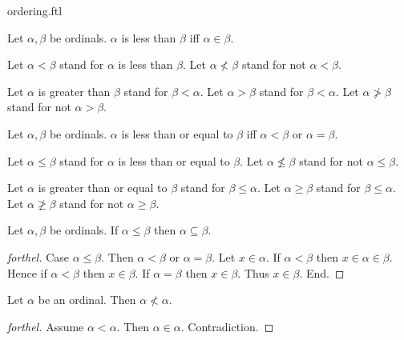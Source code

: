 \documentclass{naproche-library}
\begin{document}
\begin{smodule}[title=The Standard Ordering of the Ordinals]{ordering.ftl}

\begin{definition}[forthel,id=SET_THEORY_02_6654252130762752]
  Let $\alpha, \beta$ be ordinals.
  $\alpha$ is less than $\beta$ iff $\alpha \in \beta$.

  Let $\alpha < \beta$ stand for $\alpha$ is less than $\beta$.
  Let $\alpha \nless \beta$ stand for not $\alpha < \beta$.

  Let $\alpha$ is greater than $\beta$ stand for $\beta < \alpha$.
  Let $\alpha > \beta$ stand for $\beta < \alpha$.
  Let $\alpha \ngtr \beta$ stand for not $\alpha > \beta$.
\end{definition}

\begin{definition}[forthel,id=SET_THEORY_02_2639956210089984]
  Let $\alpha, \beta$ be ordinals.
  $\alpha$ is less than or equal to $\beta$ iff $\alpha < \beta$ or $\alpha = \beta$.

  Let $\alpha \leq \beta$ stand for $\alpha$ is less than or equal to $\beta$.
  Let $\alpha \nleq \beta$ stand for not $\alpha \leq \beta$.

  Let $\alpha$ is greater than or equal to $\beta$ stand for $\beta \leq \alpha$.
  Let $\alpha \geq \beta$ stand for $\beta \leq \alpha$.
  Let $\alpha \ngeq \beta$ stand for not $\alpha \geq \beta$.
\end{definition}

\begin{proposition}[forthel,id=SET_THEORY_02_3089369577553920]
  Let $\alpha, \beta$ be ordinals.
  If $\alpha \leq \beta$ then $\alpha \subseteq \beta$.
\end{proposition}
\begin{proof}[forthel]
  Case $\alpha \leq \beta$.
    Then $\alpha < \beta$ or $\alpha = \beta$.
    Let $x \in \alpha$.
    If $\alpha < \beta$ then $x \in \alpha \in \beta$.
    Hence if $\alpha < \beta$ then $x \in \beta$.
    If $\alpha = \beta$ then $x \in \beta$.
    Thus $x \in \beta$.
  End.
\end{proof}

\begin{proposition}[forthel,id=SET_THEORY_02_6229364135952384]
  Let $\alpha$ be an ordinal.
  Then $\alpha \nless \alpha$.
\end{proposition}
\begin{proof}[forthel]
  Assume $\alpha < \alpha$.
  Then $\alpha \in \alpha$.
  Contradiction.
\end{proof}


\end{smodule}
\end{document}
